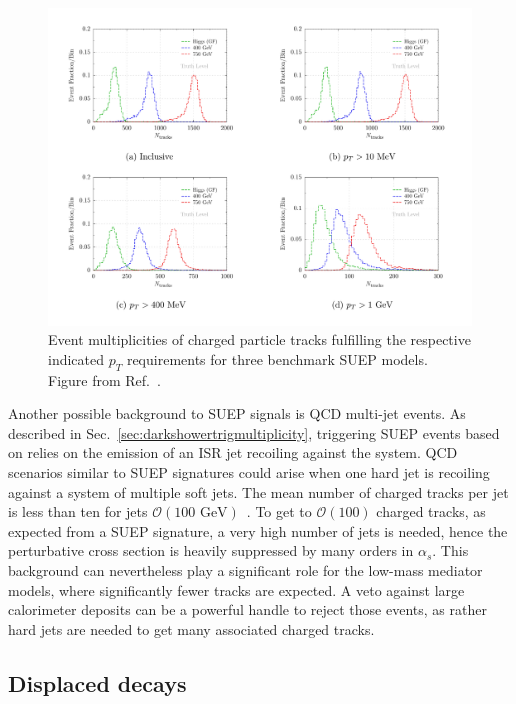 \begin{enumerate}
\begin{figure}[tbp]
  \centering
  \includegraphics[width=\textwidth]{figures/DS_chargedParticleMultiplicities_SUEP.pdf}
  \caption{Event multiplicities of charged particle tracks fulfilling the respective indicated $p_{T}$ requirements for three benchmark SUEP models. Figure from Ref.~\cite{Knapen:2016hky}. }
  \label{fig:SUEPchargedParticleMultiplicities}
\end{figure}

Another possible background to SUEP signals is QCD multi-jet events. As described in Sec.~\ref{sec:darkshowertrigmultiplicity}, triggering SUEP events based on \MET relies on the emission of an ISR jet recoiling against the system. QCD scenarios similar to SUEP signatures could arise when one hard jet is recoiling against a system of multiple soft jets. The mean number of charged tracks per jet is less than ten for jets $\mathcal{O}(\text{100~GeV})$~\cite{Aad:2016oit}. To get to $\mathcal{O}(100)$ charged tracks, as expected from a SUEP signature, a very high number of jets is needed, hence the perturbative cross section is heavily suppressed by many orders in $\alpha_{s}$. This background can nevertheless play a significant role for the low-mass mediator models, where significantly fewer tracks are expected. A veto against large calorimeter deposits can be a powerful handle to reject those events, as rather hard jets are needed to get many associated charged tracks.

\subsection{Displaced decays} %
\label{sec:darkshowerdisp}


\end{enumerate}
